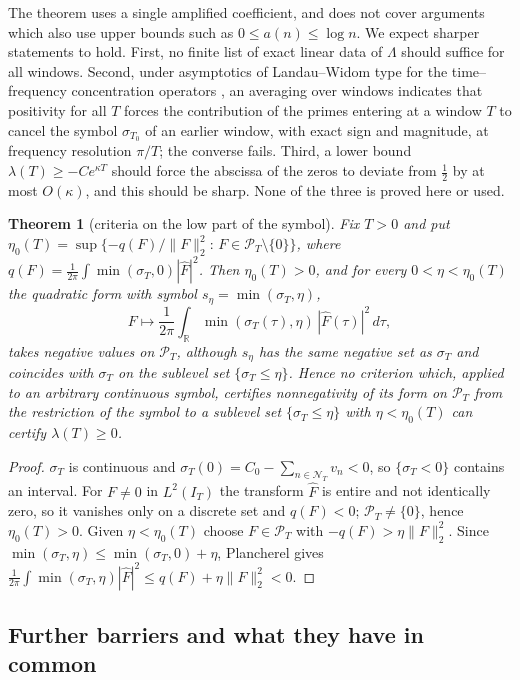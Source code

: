 \documentclass[11pt]{amsart}
\newtheorem{theorem}{Theorem}[section]
\theoremstyle{definition}
\theoremstyle{remark}
\numberwithin{equation}{section}
\newcommand{\R}{\mathbb{R}}
\newcommand{\IT}{I_T}                                  %
\newcommand{\Fh}{\widehat F}                           %
\newcommand{\PT}{\mathcal{P}_T}                        %
\newcommand{\NT}{\mathcal{N}_T}                        %
\newcommand{\sT}{\sigma_T}                             %
\newcommand{\lam}{\lambda(T)}                          %
\begin{document}
The theorem uses a single amplified coefficient, and does not cover arguments which also use upper bounds such as
$0\le a(n)\le\log n$. We expect sharper statements to hold. First, no finite list of exact linear data of $\Lambda$
should suffice for all windows. Second, under asymptotics of Landau--Widom type for the time--frequency
concentration operators \cite{LandauWidom1980}, an averaging over windows indicates that positivity for all $T$
forces the contribution of the primes entering at a window $T$ to cancel the symbol $\sigma_{T_0}$ of an earlier
window, with exact sign and magnitude, at frequency resolution $\pi/T$; the converse fails. Third, a lower bound
$\lam\ge-Ce^{\kappa T}$ should force the abscissa of the zeros to deviate from $\frac12$ by at most $O(\kappa)$,
and this should be sharp. None of the three is proved here or used.

\begin{theorem}[criteria on the low part of the symbol]\label{w3:bar:B4}
Fix $T>0$ and put $\eta_0(T)=\sup\{-q(F)/\|F\|_2^2:\,F\in\PT\setminus\{0\}\}$, where
$q(F)=\frac1{2\pi}\int\min(\sT,0)|\Fh|^2$. Then $\eta_0(T)>0$, and for every $0<\eta<\eta_0(T)$ the quadratic form
with symbol $s_\eta=\min(\sT,\eta)$,
\[
  F\mapsto\frac1{2\pi}\int_\R\min(\sT(\tau),\eta)\,|\Fh(\tau)|^2\,d\tau ,
\]
takes negative values on $\PT$, although $s_\eta$ has the same negative set as $\sT$ and coincides with $\sT$ on
the sublevel set $\{\sT\le\eta\}$. Hence no criterion which, applied to an arbitrary continuous symbol, certifies
nonnegativity of its form on $\PT$ from the restriction of the symbol to a sublevel set $\{\sT\le\eta\}$ with
$\eta<\eta_0(T)$ can certify $\lam\ge0$.
\end{theorem}

\begin{proof}
$\sT$ is continuous and $\sT(0)=C_0-\sum_{n\in\NT}v_n<0$, so $\{\sT<0\}$ contains an interval. For $F\ne0$ in
$L^2(\IT)$ the transform $\Fh$ is entire and not identically zero, so it vanishes only on a discrete set and
$q(F)<0$; $\PT\ne\{0\}$, hence $\eta_0(T)>0$. Given $\eta<\eta_0(T)$ choose $F\in\PT$ with
$-q(F)>\eta\|F\|_2^2$. Since $\min(\sT,\eta)\le\min(\sT,0)+\eta$, Plancherel gives
$\frac1{2\pi}\int\min(\sT,\eta)|\Fh|^2\le q(F)+\eta\|F\|_2^2<0$.
\end{proof}

\subsection{Further barriers and what they have in common}
\label{w3:subsec:announced}\label{w3:subsec:mechanism}\label{w3:tab:barriers}
\end{document}
